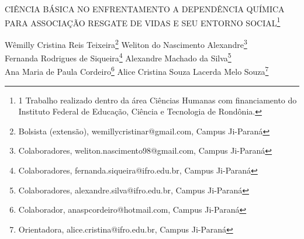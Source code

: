 \documentclass[article,12pt,onesidea,4paper,english,brazil]{abntex2}
\begin{document}
	
	
	\frenchspacing 
	
	\begin{center}
		\LARGE CIÊNCIA BÁSICA NO ENFRENTAMENTO A DEPENDÊNCIA QUÍMICA PARA ASSOCIAÇÃO RESGATE DE VIDAS E SEU ENTORNO SOCIAL\footnote{1	Trabalho realizado dentro da área Ciências Humanas com financiamento do Instituto Federal de Educação, Ciência e Tecnologia de Rondônia.}
		
		\normalsize
		Wêmilly Cristina Reis Teixeira\footnote{Bolsista (extensão), wemillycristinar@gmail.com, Campus Ji-Paraná} 
		Weliton do Nascimento Alexandre\footnote{Colaboradores, weliton.nascimento98@gmail.com,  Campus Ji-Paraná} \\
		Fernanda Rodrigues de Siqueira\footnote{Colaboradores, fernanda.siqueira@ifro.edu.br, Campus Ji-Paraná} 
		Alexandre Machado da Silva\footnote{Colaboradores, alexandre.silva@ifro.edu.br,  Campus Ji-Paraná}\\
		Ana Maria de Paula Cordeiro\footnote{Colaborador, anaspcordeiro@hotmail.com, Campus Ji-Paraná}
		Alice Cristina Souza Lacerda Melo Souza\footnote{Orientadora, alice.cristina@ifro.edu.br, Campus Ji-Paraná} 
	\end{center}
	
\end{document}
